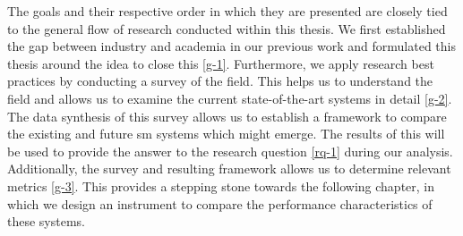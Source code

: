 The goals and their respective order in which they are  presented are closely tied to the general flow of research conducted within this thesis. We first established the gap between industry and academia in our previous work  and formulated this thesis around the idea to close this \ref{g-1}. Furthermore, we apply research best practices by conducting a survey of the field. This helps us to understand the field and allows us to examine the current state-of-the-art systems in detail \ref{g-2}. The data synthesis of this survey allows us to establish a framework to compare the existing and future \gls{sm} systems which might emerge. The results of this will be used to provide the answer to the research question \ref{rq-1} during our analysis. Additionally, the survey and resulting framework allows us to determine relevant metrics \ref{g-3}. This provides a stepping stone towards the following chapter, in which we design an instrument to compare the performance characteristics of these systems. 